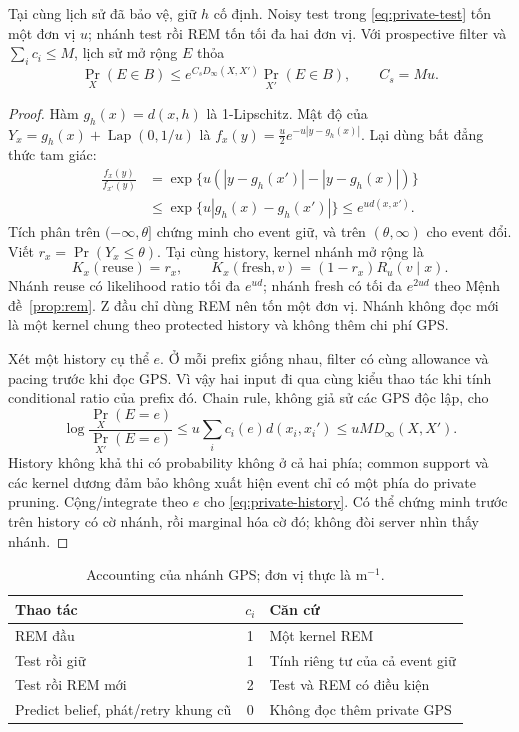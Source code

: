 \begin{proposition}\label{prop:reuse}
Tại cùng lịch sử đã bảo vệ, giữ $h$ cố định. Noisy test trong \eqref{eq:private-test} tốn một
đơn vị $u$; nhánh test rồi REM tốn tối đa hai đơn vị. Với prospective filter và
$\sum_i c_i\le M$, lịch sử mở rộng $E$ thỏa
\begin{equation}
\Pr_X(E\in B)\le e^{C_sD_\infty(X,X')}\Pr_{X'}(E\in B),\qquad C_s=Mu.
\label{eq:private-history}
\end{equation}
\end{proposition}
\begin{proof}
Hàm $g_h(x)=d(x,h)$ là 1-Lipschitz. Mật độ của
$Y_x=g_h(x)+\operatorname{Lap}(0,1/u)$ là $f_x(y)=\frac u2e^{-u|y-g_h(x)|}$.
Lại dùng bất đẳng thức tam giác:
\begin{align}
\frac{f_x(y)}{f_{x'}(y)}
&=\exp\{u(|y-g_h(x')|-|y-g_h(x)|)\}\nonumber\\
&\le\exp\{u|g_h(x)-g_h(x')|\}\le e^{u d(x,x')}.
\label{eq:test-ratio}
\end{align}
Tích phân trên $(-\infty,\theta]$ chứng minh cho event giữ, và trên $(\theta,\infty)$ cho event đổi.
Viết $r_x=\Pr(Y_x\le\theta)$. Tại cùng history, kernel nhánh mở rộng là
\[
K_x(\mathrm{reuse})=r_x,\qquad
K_x(\mathrm{fresh},v)=(1-r_x)R_u(v\mid x).
\]
Nhánh reuse có likelihood ratio tối đa $e^{ud}$; nhánh fresh có tối đa $e^{2ud}$ theo
Mệnh đề~\ref{prop:rem}. Z đầu chỉ dùng REM nên tốn một đơn vị. Nhánh không đọc mới là một kernel
chung theo protected history và không thêm chi phí GPS.

Xét một history cụ thể $e$. Ở mỗi prefix giống nhau, filter có cùng allowance và pacing trước khi
đọc GPS. Vì vậy hai input đi qua cùng kiểu thao tác khi tính conditional ratio của prefix đó.
Chain rule, không giả sử các GPS độc lập, cho
\begin{equation}
\log\frac{\Pr_X(E=e)}{\Pr_{X'}(E=e)}
\le u\sum_i c_i(e)d(x_i,x_i')
\le uM D_\infty(X,X').
\label{eq:chain-geoi}
\end{equation}
History không khả thi có probability không ở cả hai phía; common support và các kernel dương
đảm bảo không xuất hiện event chỉ có một phía do private pruning. Cộng/integrate theo $e$ cho
\eqref{eq:private-history}. Có thể chứng minh trước trên history có cờ nhánh, rồi marginal hóa
cờ đó; không đòi server nhìn thấy nhánh.
\end{proof}

\begin{table}[htbp]\centering\small
\caption{Accounting của nhánh GPS; đơn vị thực là m$^{-1}$.}\label{tab:accounting}
\begin{tabularx}{\linewidth}{@{}YcY@{}}\toprule
Thao tác & $c_i$ & Căn cứ\\\midrule
REM đầu & 1 & Một kernel REM\\
Test rồi giữ & 1 & Tính riêng tư của cả event giữ\\
Test rồi REM mới & 2 & Test và REM có điều kiện\\
Predict belief, phát/retry khung cũ & 0 & Không đọc thêm private GPS\\\bottomrule
\end{tabularx}
\end{table}

